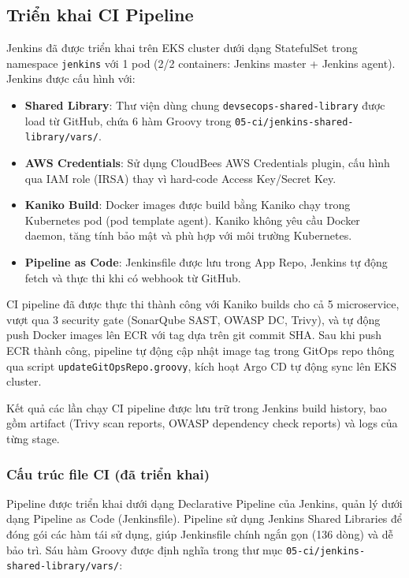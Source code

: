 \documentclass[13pt,a4paper,twoside]{extarticle}
\begin{document}
\subsection{Triển khai CI Pipeline}

Jenkins đã được triển khai trên EKS cluster dưới dạng StatefulSet trong namespace \texttt{jenkins} với 1 pod (2/2 containers: Jenkins master + Jenkins agent). Jenkins được cấu hình với:

\begin{itemize}[leftmargin=*,nosep]
  \item \textbf{Shared Library}: Thư viện dùng chung \texttt{devsecops-shared-library} được load từ GitHub, chứa 6 hàm Groovy trong \texttt{05-ci/jenkins-shared-library/vars/}.
  \item \textbf{AWS Credentials}: Sử dụng CloudBees AWS Credentials plugin, cấu hình qua IAM role (IRSA) thay vì hard-code Access Key/Secret Key.
  \item \textbf{Kaniko Build}: Docker images được build bằng Kaniko chạy trong Kubernetes pod (pod template agent). Kaniko không yêu cầu Docker daemon, tăng tính bảo mật và phù hợp với môi trường Kubernetes.
  \item \textbf{Pipeline as Code}: Jenkinsfile được lưu trong App Repo, Jenkins tự động fetch và thực thi khi có webhook từ GitHub.
\end{itemize}

CI pipeline đã được thực thi thành công với Kaniko builds cho cả 5 microservice, vượt qua 3 security gate (SonarQube SAST, OWASP DC, Trivy), và tự động push Docker images lên ECR với tag dựa trên git commit SHA. Sau khi push ECR thành công, pipeline tự động cập nhật image tag trong GitOps repo thông qua script \texttt{updateGitOpsRepo.groovy}, kích hoạt Argo CD tự động sync lên EKS cluster.

Kết quả các lần chạy CI pipeline được lưu trữ trong Jenkins build history, bao gồm artifact (Trivy scan reports, OWASP dependency check reports) và logs của từng stage.

\subsubsection{Cấu trúc file CI (đã triển khai)}

Pipeline được triển khai dưới dạng Declarative Pipeline của Jenkins, quản lý dưới dạng Pipeline as Code (Jenkinsfile). Pipeline sử dụng Jenkins Shared Libraries để đóng gói các hàm tái sử dụng, giúp Jenkinsfile chính ngắn gọn (136 dòng) và dễ bảo trì. Sáu hàm Groovy được định nghĩa trong thư mục \texttt{05-ci/jenkins-shared-library/vars/}:
\end{document}
